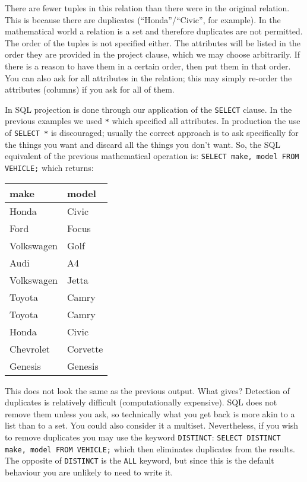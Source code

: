 \documentclass[a4paper]{report}
\begin{document}
There are fewer tuples in this relation than there were in the original relation. This is because there are duplicates (``Honda''/``Civic'', for example). In the mathematical world a relation is a set and therefore duplicates are not permitted. The order of the tuples is not specified either. The attributes will be listed in the order they are provided in the project clause, which we may choose arbitrarily. If there is a reason to have them in a certain order, then put them in that order. You can also ask for all attributes in the relation; this may simply re-order the attributes (columns) if you ask for all of them.

In SQL projection is done through our application of the \texttt{SELECT} clause. In the previous examples we used \texttt{*} which specified all attributes. In production the use of \texttt{SELECT *} is discouraged; usually the correct approach is to ask specifically for the things you want and discard all the things you don't want. So, the SQL equivalent of the previous mathematical operation is: \texttt{SELECT make, model FROM VEHICLE;} which returns:

\begin{center}
\begin{tabular}{|l|l|} \hline
	\textbf{make} & \textbf{model} \\ \hline
	Honda & Civic \\ \hline
	Ford & Focus \\ \hline
	Volkswagen & Golf \\ \hline
	Audi & A4  \\ \hline
	Volkswagen & Jetta \\ \hline
	Toyota & Camry  \\ \hline
	Toyota & Camry  \\ \hline
	Honda & Civic  \\ \hline
	Chevrolet & Corvette  \\ \hline
	 Genesis & Genesis \\ \hline
\end{tabular}
\end{center}

This does not look the same as the previous output. What gives? Detection of duplicates is relatively difficult (computationally expensive). SQL does not remove them unless you ask, so technically what you get back is more akin to a list than to a set. You could also consider it a multiset.  Nevertheless, if you wish to remove duplicates you may use the keyword \texttt{DISTINCT}: \texttt{SELECT DISTINCT make, model FROM VEHICLE;} which then eliminates duplicates from the results. The opposite of \texttt{DISTINCT} is the \texttt{ALL} keyword, but since this is the default behaviour you are unlikely to need to write it.
\end{document}
